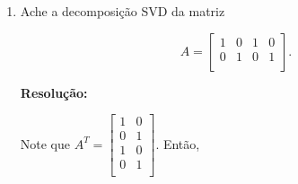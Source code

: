 \documentclass[leqno]{article}
\begin{document}
\begin{enumerate}
    \item Ache a decomposição SVD da matriz
    
    $$A=\begin{bmatrix}
    1 & 0 & 1 & 0\\
    0 & 1 & 0 & 1\\
    \end{bmatrix}\text{.}$$
    
    \textbf{Resolução:}
    
    Note que $A^T=\begin{bmatrix}
    1 & 0\\
    0 & 1\\
    1 & 0\\
    0 & 1\\
    \end{bmatrix}$. Então,
    

\end{enumerate}
\end{document}

